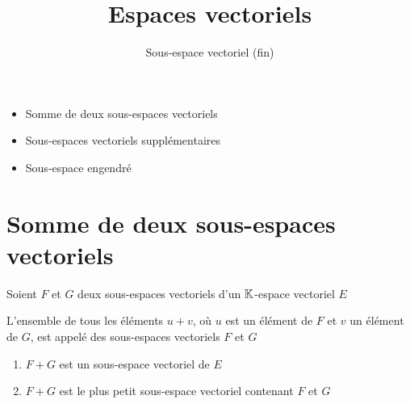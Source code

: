 






\title{{\bf Espaces vectoriels}}
\subtitle{Sous-espace vectoriel (fin)}

\begin{frame}
  
  \debutmontitre

  \pause

{\footnotesize
\hfill
{}
\begin{minipage}{0.6\textwidth}
  \begin{itemize}
    \item<3-> Somme de deux sous-espaces vectoriels
    \item<4-> Sous-espaces vectoriels supplémentaires
    \item<5-> Sous-espace engendré  
  \end{itemize}
\end{minipage}
}

\end{frame}

\setcounter{framenumber}{0}



\section{Somme de deux sous-espaces vectoriels}

\begin{frame}
Soient $F$ et $G$ deux sous-espaces vectoriels d'un $\mathbb{K}$-espace vectoriel $E$
\begin{mydefinition}
L'ensemble de tous les éléments $u+v$, où $u$ est un élément de 
$F$ et $v$ un élément de $G$, est appelé  des sous-espaces vectoriels 
$F$ et $G$
\end{mydefinition}

\pause


\begin{minipage}{0.6\textwidth}
\end{minipage}
\pause
\begin{minipage}{0.39\textwidth}
\end{minipage}

\pause

\begin{proposition}
\begin{enumerate}
  \item $F+G$ est un sous-espace vectoriel de $E$
  \pause
  \item $F+G$ est le plus petit sous-espace vectoriel contenant $F$ et $G$
\end{enumerate}
\end{proposition}
\end{frame}


